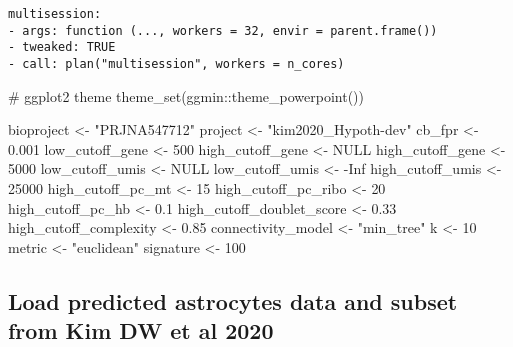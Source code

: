 \documentclass[
  letterpaper,
  DIV=11,
  numbers=noendperiod]{scrartcl}
\newenvironment{Shaded}{\begin{snugshade}}{\end{snugshade}}
\newcommand{\CommentTok}[1]{\textcolor[rgb]{0.37,0.37,0.37}{#1}}
\newcommand{\ConstantTok}[1]{\textcolor[rgb]{0.56,0.35,0.01}{#1}}
\newcommand{\DecValTok}[1]{\textcolor[rgb]{0.68,0.00,0.00}{#1}}
\newcommand{\FloatTok}[1]{\textcolor[rgb]{0.68,0.00,0.00}{#1}}
\newcommand{\FunctionTok}[1]{\textcolor[rgb]{0.28,0.35,0.67}{#1}}
\newcommand{\NormalTok}[1]{\textcolor[rgb]{0.00,0.23,0.31}{#1}}
\newcommand{\OtherTok}[1]{\textcolor[rgb]{0.00,0.23,0.31}{#1}}
\newcommand{\SpecialCharTok}[1]{\textcolor[rgb]{0.37,0.37,0.37}{#1}}
\newcommand{\StringTok}[1]{\textcolor[rgb]{0.13,0.47,0.30}{#1}}
\begin{document}
\begin{verbatim}
multisession:
- args: function (..., workers = 32, envir = parent.frame())
- tweaked: TRUE
- call: plan("multisession", workers = n_cores)
\end{verbatim}

\begin{Shaded}
\begin{Highlighting}[]
\CommentTok{\# ggplot2 theme}
\FunctionTok{theme\_set}\NormalTok{(ggmin}\SpecialCharTok{::}\FunctionTok{theme\_powerpoint}\NormalTok{())}
\end{Highlighting}
\end{Shaded}

\begin{Shaded}
\begin{Highlighting}[]
\NormalTok{bioproject }\OtherTok{\textless{}{-}} \StringTok{"PRJNA547712"}
\NormalTok{project }\OtherTok{\textless{}{-}} \StringTok{"kim2020\_Hypoth{-}dev"}
\NormalTok{cb\_fpr }\OtherTok{\textless{}{-}} \FloatTok{0.001}
\NormalTok{low\_cutoff\_gene }\OtherTok{\textless{}{-}} \DecValTok{500}
\NormalTok{high\_cutoff\_gene }\OtherTok{\textless{}{-}} \ConstantTok{NULL}
\NormalTok{high\_cutoff\_gene }\OtherTok{\textless{}{-}} \DecValTok{5000}
\NormalTok{low\_cutoff\_umis }\OtherTok{\textless{}{-}} \ConstantTok{NULL}
\NormalTok{low\_cutoff\_umis }\OtherTok{\textless{}{-}} \SpecialCharTok{{-}}\ConstantTok{Inf}
\NormalTok{high\_cutoff\_umis }\OtherTok{\textless{}{-}} \DecValTok{25000}
\NormalTok{high\_cutoff\_pc\_mt }\OtherTok{\textless{}{-}} \DecValTok{15}
\NormalTok{high\_cutoff\_pc\_ribo }\OtherTok{\textless{}{-}} \DecValTok{20}
\NormalTok{high\_cutoff\_pc\_hb }\OtherTok{\textless{}{-}} \FloatTok{0.1}
\NormalTok{high\_cutoff\_doublet\_score }\OtherTok{\textless{}{-}} \FloatTok{0.33}
\NormalTok{high\_cutoff\_complexity }\OtherTok{\textless{}{-}} \FloatTok{0.85}
\NormalTok{connectivity\_model }\OtherTok{\textless{}{-}} \StringTok{"min\_tree"}
\NormalTok{k }\OtherTok{\textless{}{-}} \DecValTok{10}
\NormalTok{metric }\OtherTok{\textless{}{-}} \StringTok{"euclidean"}
\NormalTok{signature }\OtherTok{\textless{}{-}} \DecValTok{100}
\end{Highlighting}
\end{Shaded}

\hypertarget{load-predicted-astrocytes-data-and-subset-from-kim-dw-et-al-2020}{%
\subsection{Load predicted astrocytes data and subset from Kim DW et al
2020}\label{load-predicted-astrocytes-data-and-subset-from-kim-dw-et-al-2020}}
\end{document}

